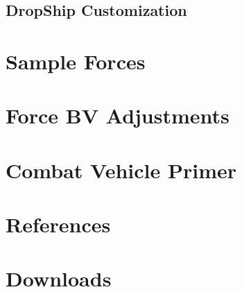\documentclass{article}
\newcommand{\mysectiontitle}{}
\newcommand{\newsection}[2]{\renewcommand{\mysectiontitle}{#2}\section{#1}}
\begin{document}


\subsection{DropShip Customization}



\newpage

\newsection{Sample Forces}{sample-forces}
\label{sec:sample_forces}



\newpage

\newsection{Force BV Adjustments}{bv-adjustments}
\label{sec:force_bv_adjustments}



\newpage

\newsection{Combat Vehicle Primer}{combat-vehicle-primer}
\label{sec:combat_vehicle_primer}



\newpage

\newsection{References}{references}
\label{sec:references}



\newpage

\newsection{Downloads}{downloads}
\label{sec:downloads}



\newpage
\end{document}
